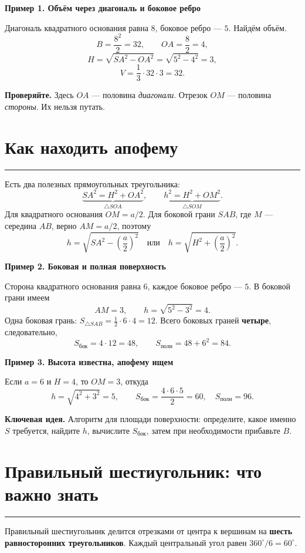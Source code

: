 \documentclass[a4paper,12pt]{article}
\newcommand{\sect}[1]{\section{#1}\vspace{-1.5mm}\noindent\color{accent}\rule{\linewidth}{0.45pt}\color{textgray}\vspace{2mm}}
\newcommand{\keyidea}[1]{\par\textcolor{darkaccent}{\textbf{Ключевая идея.}} #1\par}
\newcommand{\warning}[1]{\par\textcolor{darkaccent}{\textbf{Проверяйте.}} #1\par}
\newcommand{\ex}[1]{\par\medskip\noindent\textcolor{darkaccent}{\textbf{#1}}\par}
\begin{document}
\ex{Пример 1. Объём через диагональ и боковое ребро}
Диагональ квадратного основания равна \(8\), боковое ребро --- \(5\). Найдём объём.
\[
B=\frac{8^2}{2}=32,\qquad
OA=\frac82=4,
\]
\[
H=\sqrt{SA^2-OA^2}=\sqrt{5^2-4^2}=3,
\]
\[
\boxed{V=\frac13\cdot32\cdot3=32}.
\]
\warning{Здесь \(OA\) --- половина \emph{диагонали}. Отрезок \(OM\) --- половина \emph{стороны}. Их нельзя путать.}

\sect{Как находить апофему}
Есть два полезных прямоугольных треугольника:
\[
\underbrace{SA^2=H^2+OA^2}_{\triangle SOA},
\qquad
\underbrace{h^2=H^2+OM^2}_{\triangle SOM}.
\]
Для квадратного основания \(OM=a/2\). Для боковой грани \(SAB\), где \(M\) --- середина \(AB\), верно \(AM=a/2\), поэтому
\[
\boxed{h=\sqrt{SA^2-\left(\frac a2\right)^2}}
\quad\text{или}\quad
\boxed{h=\sqrt{H^2+\left(\frac a2\right)^2}}.
\]

\ex{Пример 2. Боковая и полная поверхность}
Сторона квадратного основания равна \(6\), каждое боковое ребро --- \(5\). В боковой грани имеем
\[
AM=3,\qquad h=\sqrt{5^2-3^2}=4.
\]
Одна боковая грань: \(S_{\triangle SAB}=\tfrac12\cdot6\cdot4=12\).
Всего боковых граней \textbf{четыре}, следовательно,
\[
S_{\text{бок}}=4\cdot12=48,\qquad
\boxed{S_{\text{полн}}=48+6^2=84}.
\]

\ex{Пример 3. Высота известна, апофему ищем}
Если \(a=6\) и \(H=4\), то \(OM=3\), откуда
\[
h=\sqrt{4^2+3^2}=5,\qquad
S_{\text{бок}}=\frac{4\cdot6\cdot5}{2}=60,
\quad S_{\text{полн}}=96.
\]
\keyidea{Алгоритм для площади поверхности: определите, какое именно \(S\) требуется, найдите \(h\), вычислите \(S_{\text{бок}}\), затем при необходимости прибавьте \(B\).}

\sect{Правильный шестиугольник: что важно знать}
Правильный шестиугольник делится отрезками от центра к вершинам на \textbf{шесть равносторонних треугольников}. Каждый центральный угол равен \(360^\circ/6=60^\circ\).
\end{document}

